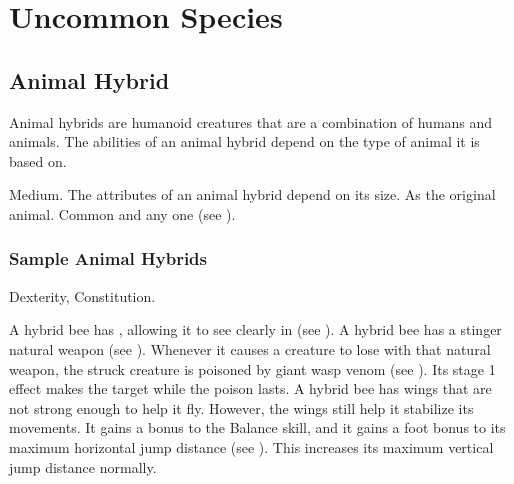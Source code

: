\chapter{Uncommon Species}\label{Uncommon Species}

\section{Animal Hybrid}
  Animal hybrids are humanoid creatures that are a combination of humans and animals.
  The abilities of an animal hybrid depend on the type of animal it is based on.

   Medium.
   The attributes of an animal hybrid depend on its size.
   As the original animal.
   Common and any one  (see ).

  \subsection{Sample Animal Hybrids}


      Dexterity,  Constitution.
    \begin{raggeditemize}
       A hybrid bee has , allowing it to see clearly in  (see ).
       A hybrid bee has a stinger natural weapon (see ).
        Whenever it causes a creature to lose  with that natural weapon, the struck creature is poisoned by giant wasp venom (see ).
        Its stage 1 effect makes the target \slowed while the poison lasts.
       A hybrid bee has wings that are not strong enough to help it fly.
        However, the wings still help it stabilize its movements.
        It gains a  bonus to the Balance skill, and it gains a  foot bonus to its maximum horizontal jump distance (see ).
        This increases its maximum vertical jump distance normally.
    \end{raggeditemize}


